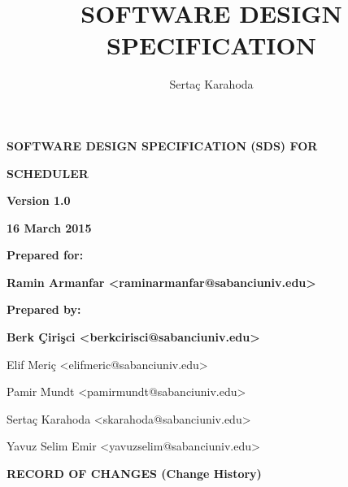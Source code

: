 \documentclass[twoside,letterpaper]{article}
\title{SOFTWARE DESIGN SPECIFICATION}
\author{Serta\c{c} Karahoda}
\date{\currenttime}
\begin{document}
\clearpage\setcounter{page}{1}\pagestyle{Standard}
\thispagestyle{Preface}

\vspace*{1.5in}
{\centering{}\bfseries\color{black}
 SOFTWARE DESIGN SPECIFICATION (SDS) FOR 
\par}

\bigskip

{\centering{}\bfseries\color{black}
SCHEDULER
\par}


\bigskip


\bigskip


\bigskip


\bigskip

{\centering{}\bfseries\color{black}
Version 1.0
\par}

{\centering{}\bfseries\color{black}
16 March 2015
\par}


\bigskip


\bigskip

{\centering{}\bfseries\color{black}
Prepared for:
\par}

{\centering{}\bfseries\color{black}
Ramin Armanfar <raminarmanfar@sabanciuniv.edu>

\par}


\bigskip


\bigskip

{\centering{}\bfseries\color{black}
Prepared by:
\par}

{\centering{}\bfseries\color{black}
Berk \c{C}iri\c{s}ci <berkcirisci@sabanciuniv.edu>

Elif Meri\c{c} <elifmeric@sabanciuniv.edu>

Pamir Mundt <pamirmundt@sabanciuniv.edu>

Serta\c{c} Karahoda <skarahoda@sabanciuniv.edu>

Yavuz Selim Emir <yavuzselim@sabanciuniv.edu>
\par}


{\centering{}\bfseries\color{black}
RECORD OF CHANGES (Change History)
\par}
\end{document}
